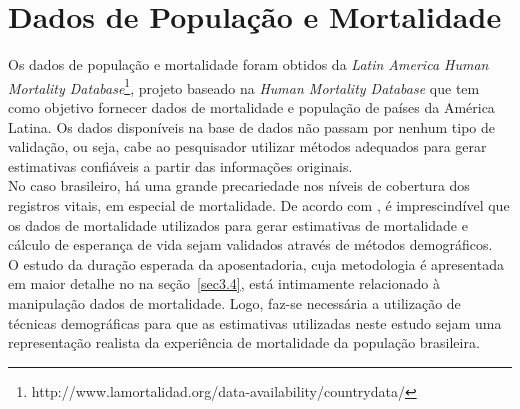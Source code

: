 \documentclass[12pt, 						%
			openright, 					%
			twoside,					%
			a4paper,x					%
			english,					%
			brazil]{abntex2}				%
\begin{document}
	\section{Dados de População e Mortalidade \label{sec3.1}}
	Os dados de população e mortalidade foram obtidos da \textit{Latin America Human Mortality Database}\footnote{http://www.lamortalidad.org/data-availability/countrydata/}, projeto baseado na \textit{Human Mortality Database} que tem como objetivo fornecer dados de mortalidade e população de países da América Latina. Os dados disponíveis na base de dados não passam por nenhum tipo de validação, ou seja, cabe ao pesquisador utilizar métodos adequados para gerar estimativas confiáveis a partir das informações originais.\\
	No caso brasileiro, há uma grande precariedade nos níveis de cobertura dos registros vitais, em especial de mortalidade.  De acordo com , é imprescindível que os dados de mortalidade utilizados para gerar estimativas de mortalidade e cálculo de esperança de vida sejam validados através de métodos demográficos. \\
		O estudo da duração esperada da aposentadoria, cuja metodologia é apresentada em maior detalhe no na seção~\ref{sec3.4}, está intimamente relacionado à manipulação dados de mortalidade. Logo, faz-se necessária a utilização de técnicas demográficas para que as estimativas utilizadas neste estudo sejam uma representação realista da experiência de mortalidade da população brasileira. \\
\end{document}

